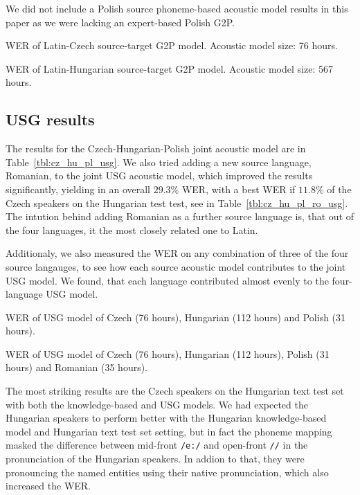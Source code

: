 \documentclass[runningheads,a4paper]{llncs}
\begin{document}
We did not include a Polish source phoneme-based acoustic model results in this paper as we were lacking an expert-based Polish G2P.

\begin{table}
\parbox{.45\linewidth}{
\centering
\caption{WER of Latin-Czech source-target G2P model. Acoustic model size: 76 hours.}
\label{tbl:cz_phoneme}
}
\hfill
\parbox{.45\linewidth}{
\centering
\caption{WER of Latin-Hungarian source-target G2P model. Acoustic model size: 567 hours.}
\label{tbl:hu_phoneme}
}
\end{table}

\subsection{USG results}
The results for the Czech-Hungarian-Polish joint acoustic model are in Table~\ref{tbl:cz_hu_pl_usg}.
We also tried adding a new source language, Romanian, to the joint USG acoustic model, which improved the results significantly, yielding in an overall $29.3\%$ WER, with a best WER if $11.8\%$ of the Czech speakers on the Hungarian test test, see in Table~\ref{tbl:cz_hu_pl_ro_usg}.
The intution behind adding Romanian as a further source language is, that out of the four languages, it the most closely related one to Latin.

Additionaly, we also measured the WER on any combination of three of the four source langauges, to see how each source acoustic model contributes to the joint USG model.
We found, that each language contributed almost evenly to the four-language USG model. 
\begin{table}
\parbox{.45\linewidth}{
\centering
\caption{WER of USG model of Czech (76 hours), Hungarian (112 hours) and Polish (31 hours).}
\label{tbl:cz_hu_pl_usg}
}
\hfill
\parbox{.45\linewidth}{
\centering
\caption{WER of USG model of Czech (76 hours), Hungarian (112 hours), Polish (31 hours) and Romanian (35 hours).}
\label{tbl:cz_hu_pl_ro_usg}
}
\end{table}

The most striking results are the Czech speakers on the Hungarian text test set with both the knowledge-based and USG models.
We had expected the Hungarian speakers to perform better with the Hungarian knowledge-based model and Hungarian text test set setting, but in fact the phoneme mapping masked the difference between mid-front \texttt{/e:/} and open-front \texttt{//} in the pronunciation of the Hungarian speakers.
In addion to that, they were pronouncing the named entities using their native pronunciation, which also increased the WER.
\end{document}
